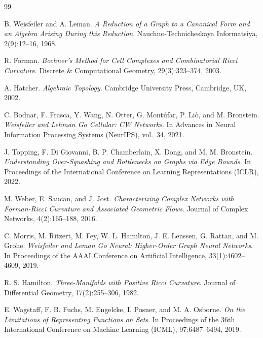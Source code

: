 \documentclass[11pt, letterpaper]{article}
\begin{document}
\begin{thebibliography}{99}

B. Weisfeiler and A. Leman. \textit{A Reduction of a Graph to a Canonical Form and an Algebra Arising During this Reduction}. Nauchno-Technicheskaya Informatsiya, 2(9):12--16, 1968.

R. Forman. \textit{Bochner's Method for Cell Complexes and Combinatorial Ricci Curvature}. Discrete \& Computational Geometry, 29(3):323--374, 2003.

A. Hatcher. \textit{Algebraic Topology}. Cambridge University Press, Cambridge, UK, 2002.

C. Bodnar, F. Frasca, Y. Wang, N. Otter, G. Mont\'ufar, P. Li\`o, and M. Bronstein. \textit{Weisfeiler and Lehman Go Cellular: CW Networks}. In Advances in Neural Information Processing Systems (NeurIPS), vol.~34, 2021.

J. Topping, F. Di Giovanni, B. P. Chamberlain, X. Dong, and M. M. Bronstein. \textit{Understanding Over-Squashing and Bottlenecks on Graphs via Edge Bounds}. In Proceedings of the International Conference on Learning Representations (ICLR), 2022.

M. Weber, E. Saucan, and J. Jost. \textit{Characterizing Complex Networks with Forman-Ricci Curvature and Associated Geometric Flows}. Journal of Complex Networks, 4(2):165--188, 2016.

C. Morris, M. Ritzert, M. Fey, W. L. Hamilton, J. E. Lenssen, G. Rattan, and M. Grohe. \textit{Weisfeiler and Leman Go Neural: Higher-Order Graph Neural Networks}. In Proceedings of the AAAI Conference on Artificial Intelligence, 33(1):4602--4609, 2019.

R. S. Hamilton. \textit{Three-Manifolds with Positive Ricci Curvature}. Journal of Differential Geometry, 17(2):255--306, 1982.

E. Wagstaff, F. B. Fuchs, M. Engelcke, I. Posner, and M. A. Osborne. \textit{On the Limitations of Representing Functions on Sets}. In Proceedings of the 36th International Conference on Machine Learning (ICML), 97:6487--6494, 2019.

\end{thebibliography}
\end{document}

